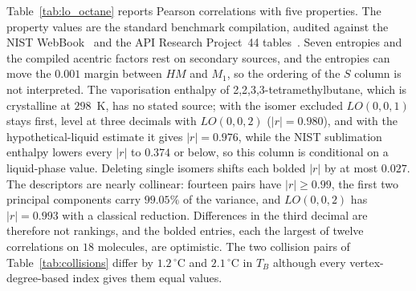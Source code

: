 \documentclass[a5paper, 10pt]{article}
\theoremstyle{plain}
\theoremstyle{remark}
\theoremstyle{definition}
\begin{document}
Table~\ref{tab:lo_octane} reports Pearson correlations with five
properties. The property values are the standard benchmark compilation,
audited against the NIST WebBook~\cite{NISTWebBook} and the API Research
Project~44 tables~\cite{APIProject44Circ461}. Seven entropies and the
compiled acentric factors rest on secondary sources, and the entropies can
move the $0.001$ margin between $HM$ and $M_1$, so the ordering of the $S$
column is not interpreted. The vaporisation enthalpy of
2,2,3,3-tetramethylbutane, which is crystalline at $298$~K, has no stated
source; with the isomer excluded $LO(0,0,1)$ stays first, level at three
decimals with $LO(0,0,2)$ ($|r| = 0.980$), and with the
hypothetical-liquid estimate it gives $|r| = 0.976$, while the NIST
sublimation enthalpy lowers every $|r|$ to $0.374$ or below, so this column
is conditional on a liquid-phase value. Deleting single isomers shifts each
bolded $|r|$ by at most $0.027$. The descriptors are nearly collinear:
fourteen pairs have $|r| \ge 0.99$, the first two principal components
carry $99.05\%$ of the variance, and $LO(0,0,2)$ has $|r| = 0.993$ with a
classical reduction. Differences in the third decimal are therefore not
rankings, and the bolded entries, each the largest of twelve correlations
on $18$ molecules, are optimistic. The two collision pairs of
Table~\ref{tab:collisions} differ by $1.2\,^{\circ}$C and $2.1\,^{\circ}$C
in $T_B$ although every vertex-degree-based index gives them equal values.
\end{document}
